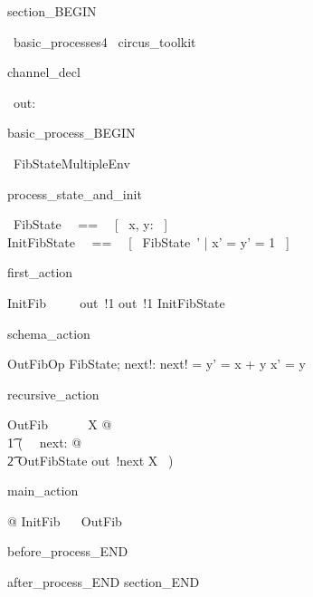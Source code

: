 section_BEGIN
\begin{zsection}
  \SECTION\ basic\_processes4 \parents\ circus\_toolkit
\end{zsection}
channel_decl
\begin{circus}
    \circchannel\ out: \nat
\end{circus}
basic_process_BEGIN
\begin{circus}
    \circprocess\ FibStateMultipleEnv ~~\circdef~~ \circbegin
\end{circus}
process_state_and_init
\begin{circusaction}
    \circstate\ FibState ~~==~~ [~ x, y: \nat ~]  \land [ z: \nat ]\\
    InitFibState ~~==~~ [~ FibState~' | x' = y' = 1 ~]
\end{circusaction}
first_action
\begin{circusaction}
    InitFib ~~\circdef~~ out~!1 \then out~!1 \then InitFibState
\end{circusaction}
schema_action
\begin{schema}{OutFibOp}
    \Delta FibState; next!: \nat
\where
    next! = y' = x + y \land x' = y
\end{schema}
recursive_action
\begin{circusaction}
    OutFib ~~\circdef~~ \circmu\ X @ \\
    	\t1 (~ \circvar\ next: \nat @ \\
	   \t2 OutFibState \circseq out~!next \then X ~)
\end{circusaction}
main_action
\begin{circusaction}
    @ InitFib ~\circseq~ OutFib
\end{circusaction}
before_process_END
\begin{circus}
    \circend
\end{circus}
after_process_END
section_END 
